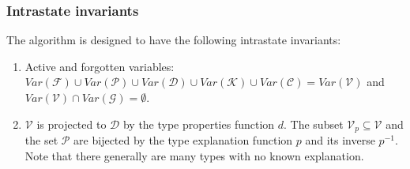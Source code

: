 \subsubsection{Intrastate invariants}

The algorithm is designed to have the following intrastate invariants:


\begin{enumerate}
    \item Active and forgotten variables: $Var(\mathcal{F}) \cup Var(\mathcal{P}) \cup Var(\mathcal{D}) \cup Var(\mathcal{K}) \cup Var(\mathcal{C}) = Var(\mathcal{V})$ and $Var(\mathcal{V}) \cap Var(\mathcal{G}) = \emptyset$. \label{invVar}

    \item $\mathcal{V}$ is projected to $\mathcal{D}$  by the type properties function $d$. The subset $\mathcal{V}_p \subseteq \mathcal{V}$ and the set $\mathcal{P}$ are bijected by the type explanation function $p$ and its inverse $p^{-1}$. Note that there generally are many types with no known explanation. \label{invPD}


\end{enumerate}
